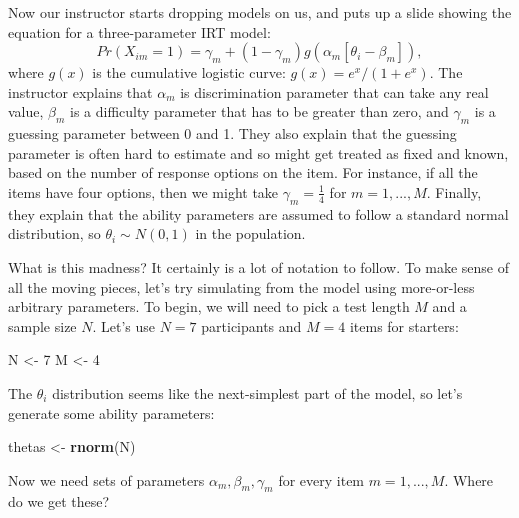 \documentclass[
]{book}
\newenvironment{Shaded}{\begin{snugshade}}{\end{snugshade}}
\newcommand{\DecValTok}[1]{\textcolor[rgb]{0.00,0.00,0.81}{#1}}
\newcommand{\FunctionTok}[1]{\textcolor[rgb]{0.13,0.29,0.53}{\textbf{#1}}}
\newcommand{\NormalTok}[1]{#1}
\newcommand{\OtherTok}[1]{\textcolor[rgb]{0.56,0.35,0.01}{#1}}
\begin{document}
Now our instructor starts dropping models on us, and puts up a slide showing the equation for a three-parameter IRT model:
\[
Pr(X_{im} = 1) = \gamma_m + (1 - \gamma_m) g\left( \alpha_m [\theta_i - \beta_m]\right),
\]
where \(g(x)\) is the cumulative logistic curve: \(g(x) = e^x / (1 + e^x)\).
The instructor explains that \(\alpha_m\) is discrimination parameter that can take any real value, \(\beta_m\) is a difficulty parameter that has to be greater than zero, and \(\gamma_m\) is a guessing parameter between 0 and 1.
They also explain that the guessing parameter is often hard to estimate and so might get treated as fixed and known, based on the number of response options on the item.
For instance, if all the items have four options, then we might take \(\gamma_m = \frac{1}{4}\) for \(m = 1,...,M\).
Finally, they explain that the ability parameters are assumed to follow a standard normal distribution, so \(\theta_i \sim N(0, 1)\) in the population.

What is this madness? It certainly is a lot of notation to follow.
To make sense of all the moving pieces, let's try simulating from the model using more-or-less arbitrary parameters.
To begin, we will need to pick a test length \(M\) and a sample size \(N\).
Let's use \(N = 7\) participants and \(M = 4\) items for starters:

\begin{Shaded}
\begin{Highlighting}[]
\NormalTok{N }\OtherTok{\textless{}{-}} \DecValTok{7}
\NormalTok{M }\OtherTok{\textless{}{-}} \DecValTok{4}
\end{Highlighting}
\end{Shaded}

The \(\theta_i\) distribution seems like the next-simplest part of the model, so let's generate some ability parameters:

\begin{Shaded}
\begin{Highlighting}[]
\NormalTok{thetas }\OtherTok{\textless{}{-}} \FunctionTok{rnorm}\NormalTok{(N)}
\end{Highlighting}
\end{Shaded}

Now we need sets of parameters \(\alpha_m, \beta_m, \gamma_m\) for every item \(m = 1,...,M\).
Where do we get these?
\end{document}
